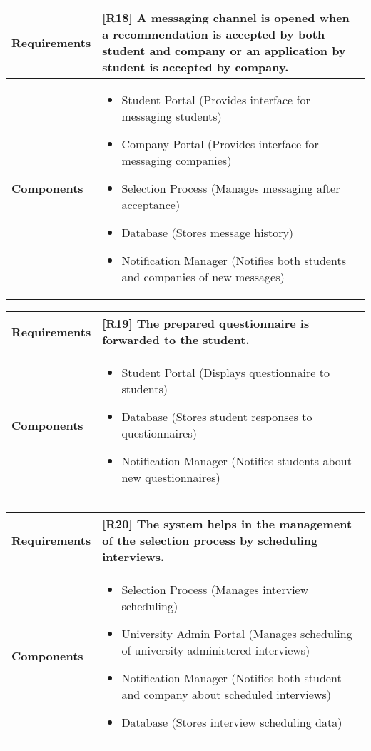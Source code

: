 \begin{table}[h!]
\centering
\begin{tabular}{|l|p{10cm}|}
\hline
\textbf{Requirements} & 
[R18] A messaging channel is opened when a recommendation is accepted by both student and company or an application by student is accepted by company.\\
\hline
\textbf{Components} & 
\begin{itemize}
    \item Student Portal (Provides interface for messaging students)
    \item Company Portal (Provides interface for messaging companies)
    \item Selection Process (Manages messaging after acceptance)
    \item Database (Stores message history)
    \item Notification Manager (Notifies both students and companies of new messages)
\end{itemize} \\
\hline
\end{tabular}
\label{tab:req_comp}
\end{table}

\begin{table}[h!]
\centering
\begin{tabular}{|l|p{10cm}|}
\hline
\textbf{Requirements} & 
[R19] The prepared questionnaire is forwarded to the student.\\
\hline
\textbf{Components} & 
\begin{itemize}
    \item Student Portal (Displays questionnaire to students)
    \item Database (Stores student responses to questionnaires)
    \item Notification Manager (Notifies students about new questionnaires)
\end{itemize} \\
\hline
\end{tabular}
\label{tab:req_comp}
\end{table}

\begin{table}[h!]
\centering
\begin{tabular}{|l|p{10cm}|}
\hline
\textbf{Requirements} & 
[R20] The system helps in the management of the selection process by scheduling interviews.\\
\hline
\textbf{Components} & 
\begin{itemize}
    \item Selection Process (Manages interview scheduling)
    \item University Admin Portal (Manages scheduling of university-administered interviews)
    \item Notification Manager (Notifies both student and company about scheduled interviews)
    \item Database (Stores interview scheduling data)
\end{itemize} \\
\hline
\end{tabular}
\label{tab:req_comp}
\end{table}

